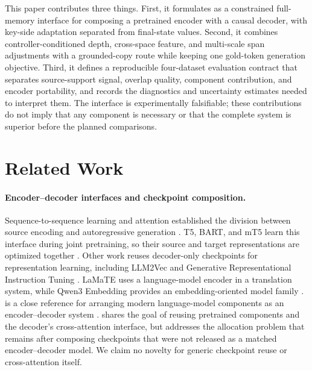 This paper contributes three things. First, it formulates \AFMR as a constrained full-memory interface for composing a pretrained encoder with a causal decoder, with key-side adaptation separated from final-state values. Second, it combines controller-conditioned depth, cross-space feature, and multi-scale span adjustments with a grounded-copy route while keeping one gold-token generation objective. Third, it defines a reproducible four-dataset evaluation contract that separates source-support signal, overlap quality, component contribution, and encoder portability, and records the diagnostics and uncertainty estimates needed to interpret them. The interface is experimentally falsifiable; these contributions do not imply that any component is necessary or that the complete system is superior before the planned comparisons.

\section{Related Work}
\label{sec:related-work}

\paragraph{Encoder--decoder interfaces and checkpoint composition.}
Sequence-to-sequence learning and attention established the division between source encoding and autoregressive generation \citep{sutskever2014sequence,bahdanau2015neural,vaswani2017attention}. T5, BART, and mT5 learn this interface during joint pretraining, so their source and target representations are optimized together \citep{raffel2020t5,lewis2020bart,xue2021mt5}. Other work reuses decoder-only checkpoints for representation learning, including LLM2Vec and Generative Representational Instruction Tuning \citep{behnamghader2024llm2vec,muennighoff2024grit}. LaMaTE uses a language-model encoder in a translation system, while Qwen3 Embedding provides an embedding-oriented model family \citep{luo2025lamate,zhang2025qwen3embedding}. \TfiveGemma is a close reference for arranging modern language-model components as an encoder--decoder system \citep{zhang2025t5gemma2}. \AFMR shares the goal of reusing pretrained components and the decoder's cross-attention interface, but addresses the allocation problem that remains after composing checkpoints that were not released as a matched encoder--decoder model. We claim no novelty for generic checkpoint reuse or cross-attention itself.

